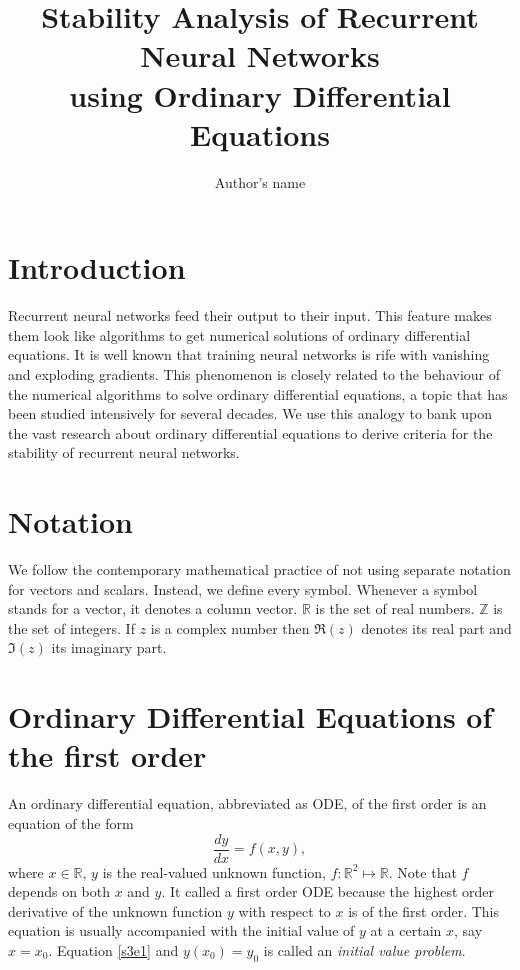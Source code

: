 \documentclass{article}
\numberwithin{equation}{section}
\begin{document}
\title{Stability Analysis of Recurrent Neural Networks \\
    using Ordinary Differential Equations}
\author{Author's name}
\maketitle
\section{Introduction}\label{s1}
Recurrent neural networks feed their output to their input. This feature
makes them look like algorithms to get numerical solutions of ordinary
differential equations. It is well known that training neural networks is
rife with vanishing and exploding gradients\cite{gereon2018hands}. This
phenomenon is closely related to the behaviour of the numerical algorithms
to solve ordinary differential equations, a topic that has been studied
intensively for several decades. We use this analogy to bank upon the 
vast research about ordinary differential equations to derive criteria 
for the stability of recurrent neural networks.

\section{Notation}\label{s2}
We follow the contemporary mathematical practice of not using separate
notation for vectors and scalars. Instead, we define every symbol. Whenever
a symbol stands for a vector, it denotes a column vector. $\mathbb{R}$ is 
the set of real numbers. $\mathbb{Z}$ is the set of integers. If $z$ is
a complex number then $\Re(z)$ denotes its real part and $\Im(z)$ its
imaginary part.

\section{Ordinary Differential Equations of the first order}\label{s3}
An ordinary differential equation, abbreviated as ODE, of the first order 
is an equation of the form
\begin{equation}\label{s3e1}
\frac{dy}{dx} = f(x, y),
\end{equation}
where $x \in \mathbb{R}$, $y$ is the real-valued unknown function, $f: 
\mathbb{R}^2 \mapsto \mathbb{R}$. Note that $f$ depends on both $x$ and 
$y$. It called a first order ODE because the highest order derivative
of the unknown function $y$ with respect to $x$ is of the first order.
This equation is usually accompanied with the initial value of $y$ at a 
certain $x$, say $x = x_0$. Equation \eqref{s3e1} and $y(x_0) = y_0$ is
called an \emph{initial value problem}.
\end{document}
